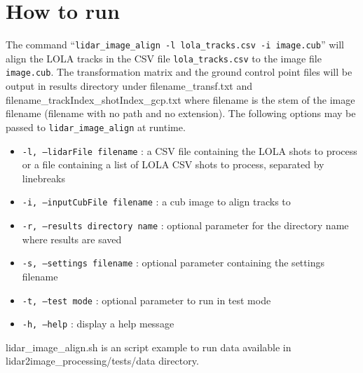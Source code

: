 \documentclass[float=false, crop=false]{standalone}
\begin{document}
\section{How to run}
The command ``\texttt{lidar\_image\_align -l lola\_tracks.csv -i image.cub}'' will        
align the LOLA tracks in the CSV file \texttt{lola\_tracks.csv} to the image file \texttt{image.cub}.
The transformation matrix and the ground control point files will be output in results directory under
filename\_transf.txt and filename\_trackIndex\_shotIndex\_gcp.txt where filename is the stem of the image
filename (filename with no path and no extension). The following options may be passed to
{\texttt{lidar\_image\_align}} at runtime.                   
\begin{itemize}
	\item{\texttt{-l, --lidarFile filename}} : a CSV file containing the LOLA shots to process or a file containing a
        list of LOLA CSV shots to process, separated by linebreaks
	\item{\texttt{-i, --inputCubFile filename}} : a cub image to align tracks to
        \item{\texttt{-r, --results directory name}} : optional parameter for the directory name where results are saved
        \item{\texttt{-s, --settings filename}} : optional parameter containing the settings filename
        \item{\texttt{-t, --test mode}} : optional parameter to run in test mode
	\item{\texttt{-h, --help}} : display a help message
\end{itemize}

lidar\_image\_align.sh is an script example to run data available in lidar2image\_processing/tests/data directory.  
\end{document}
